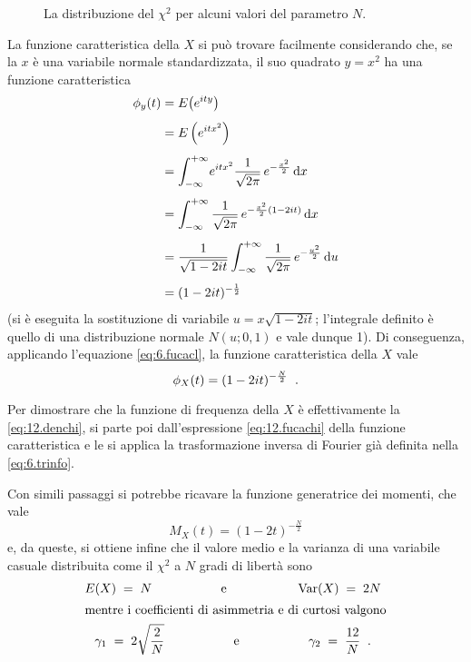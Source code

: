 \begin{figure}[hbtp]
  \vspace*{2ex}
  \begin{center} {
    
  } \end{center}
  \caption[La distribuzione del $\chi^2$]
    {La distribuzione del $\chi^2$ per alcuni
    valori del parametro $N$.}
\end{figure}

La funzione caratteristica della $X$ si pu\`o trovare
facilmente considerando che, se la $x$ \`e una variabile
normale standardizzata, il suo quadrato $y = x^2$ ha una
funzione caratteristica
\begin{align*}
  \phi_y(t) &= E \bigl( e^{ity} \bigr) \\[1ex]
  &= E \left( e^{itx^2} \right) \\[1ex]
  &= \int_{-\infty}^{+\infty} \! e^{itx^2}
    \frac{1}{\sqrt{2\pi}} \, e^{- \frac{x^2}{2}} \, \mathrm{d}
    x \\[1ex]
  &= \int_{-\infty}^{+\infty} \frac{1}{\sqrt{2\pi}}
    \, e^{- \frac{x^2}{2} (1-2it)} \, \mathrm{d} x \\[1ex]
  &= \frac{1}{\sqrt{1-2it}} \int_{-\infty}^{+\infty}
    \frac{1}{\sqrt{2\pi}} \, e^{- \frac{u^2}{2}} \, \mathrm{d}
    u \\[1ex]
  &= (1-2it)^{- \frac{1}{2}}
\end{align*}
(si \`e eseguita la sostituzione di variabile $u = x
\sqrt{1-2it}$; l'integrale definito \`e quello di una
distribuzione normale $N(u; 0,1)$ e vale dunque 1).  Di
conseguenza, applicando l'equazione \eqref{eq:6.fucacl}, la
funzione caratteristica della $X$ vale
\begin{equation} \label{eq:12.fucachi}
  \phi_X(t) = (1 - 2it)^{- \frac{N}{2}} \;\; .
\end{equation}

Per dimostrare che la funzione di frequenza della $X$ \`e
effettivamente la \eqref{eq:12.denchi}, si parte poi
dall'espressione \eqref{eq:12.fucachi} della funzione
caratteristica e le si applica la trasformazione inversa di
Fourier%
gi\`a definita nella \eqref{eq:6.trinfo}.

Con simili passaggi si potrebbe ricavare la funzione
generatrice dei momenti, che vale
\begin{equation*}
  M_X(t) = (1 - 2t)^{- \frac{N}{2}}
\end{equation*}
e, da queste, si ottiene infine che il valore medio e la
varianza di una variabile casuale distribuita come il
$\chi^2$ a $N$ gradi di libert\`a sono
\begin{gather*}
  E(X) \; = \; N \makebox[40mm]{\mbox{e}} \var(X) \; =
  \; 2N \\
  \intertext{mentre i coefficienti di asimmetria e di
    curtosi valgono}
  \gamma_1 \; = \; 2 \sqrt{\frac{2}{N}}
  \makebox[40mm]{\mbox{e}} \gamma_2 \; = \; \frac{12}{N} \peq
  .
\end{gather*}

